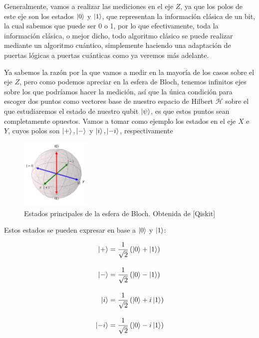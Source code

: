 \documentclass{article}
\numberwithin{equation}{section} %
\begin{document}
    \vspace{5mm}

    Generalmente, vamos a realizar las mediciones en el eje \( Z \), ya que los polos de este eje son los estados \( \ket{0} \) y \( \ket{1} \), que representan la información clásica de un bit, la cual sabemos que puede ser 0 o 1, por lo que efectivamente, toda la información clásica, o mejor dicho, todo algoritmo clásico se puede realizar mediante un algoritmo cuántico, simplemente haciendo una adaptación de puertas lógicas a puertas cuánticas como ya veremos más adelante. 

    \vspace{5mm}

    Ya sabemos la razón por la que vamos a medir en la mayoría de los casos sobre el eje \( Z \), pero como podemos apreciar en la esfera de Bloch, tenemos infinitos ejes sobre los que podríamos hacer la medición, así que la única condición para escoger dos puntos como vectores base de nuestro espacio de Hilbert \( \mathcal{H} \) sobre el que estudiaremos el estado de nuestro qubit \( \ket{\psi} \), es que estos puntos sean completamente opuestos. Vamos a tomar como ejemplo los estados en el eje \( X \) e \( Y \), cuyos polos son \( \ket{+}, \ket{-} \) y \( \ket{i}, \ket{-i} \), respectivamente

    \begin{figure}[H]
        \centering
        \includegraphics[width=0.3\textwidth]{img/Bloch/bloch_other_bases.png}
        \caption{Estados principales de la esfera de Bloch. Obtenida de [Qiskit]}\label{fig: bloch_other_bases}
    \end{figure}

    Estos estados se pueden expresar en base a \( \ket{0} \) y \( \ket{1} \):

    \begin{align}
        \label{eq: estados_eje_x_y}
        \ket{+} &= \frac{1}{\sqrt{2}} \left( \ket{0} + \ket{1} \right) \\[10pt]
        \ket{-} &= \frac{1}{\sqrt{2}} \left( \ket{0} - \ket{1} \right) \\[10pt]
        \ket{i} &= \frac{1}{\sqrt{2}} \left( \ket{0} + i\ket{1} \right) \\[10pt]
        \ket{-i} &= \frac{1}{\sqrt{2}} \left( \ket{0} - i\ket{1} \right)
    \end{align}
\end{document}
